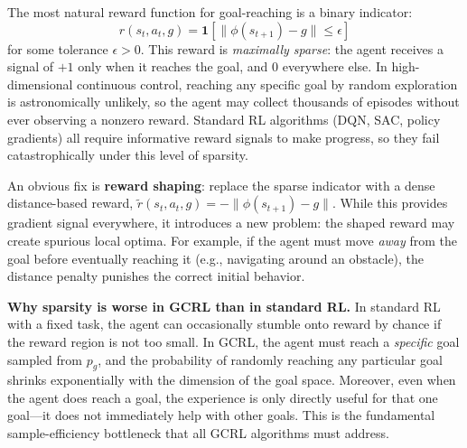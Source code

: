 \documentclass[11pt, letterpaper]{article}
\begin{document}
\begin{concept}
    The most natural reward function for goal-reaching is a binary indicator:
    \[
        r(s_t, a_t, g) = \mathbf{1}\!\left[\|\phi(s_{t+1}) - g\| \leq \epsilon\right]
    \]
    for some tolerance \(\epsilon > 0\). This reward is \textit{maximally sparse}: the agent receives a signal of \(+1\) only when it reaches the goal, and \(0\) everywhere else. In high-dimensional continuous control, reaching any specific goal by random exploration is astronomically unlikely, so the agent may collect thousands of episodes without ever observing a nonzero reward. Standard RL algorithms (DQN, SAC, policy gradients) all require informative reward signals to make progress, so they fail catastrophically under this level of sparsity.
 
    An obvious fix is \textbf{reward shaping}: replace the sparse indicator with a dense distance-based reward, \(\tilde{r}(s_t, a_t, g) = -\|\phi(s_{t+1}) - g\|\). While this provides gradient signal everywhere, it introduces a new problem: the shaped reward may create spurious local optima. For example, if the agent must move \textit{away} from the goal before eventually reaching it (e.g., navigating around an obstacle), the distance penalty punishes the correct initial behavior.
\end{concept}
 
\begin{remark}
    \textbf{Why sparsity is worse in GCRL than in standard RL.} In standard RL with a fixed task, the agent can occasionally stumble onto reward by chance if the reward region is not too small. In GCRL, the agent must reach a \textit{specific} goal sampled from \(p_g\), and the probability of randomly reaching any particular goal shrinks exponentially with the dimension of the goal space. Moreover, even when the agent does reach a goal, the experience is only directly useful for that one goal---it does not immediately help with other goals. This is the fundamental sample-efficiency bottleneck that all GCRL algorithms must address.
\end{remark}
 
\end{document}
